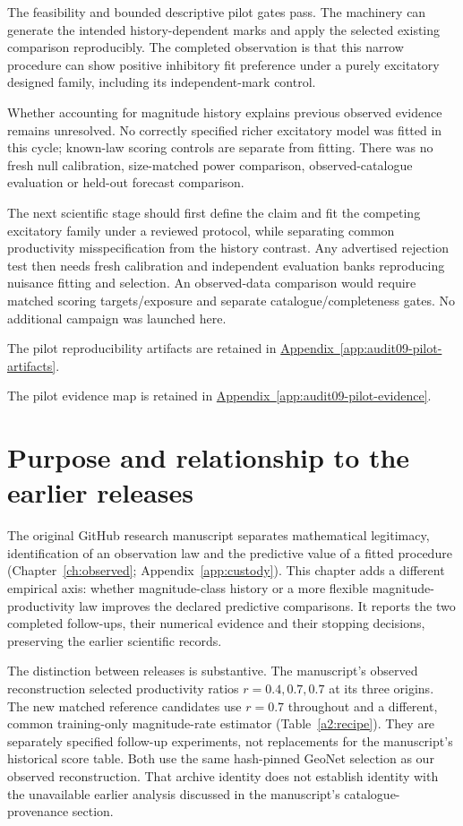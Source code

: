 The feasibility and bounded descriptive pilot gates pass. The machinery can generate the intended history-dependent marks and apply the selected existing comparison reproducibly. The completed observation is that this narrow procedure can show positive inhibitory fit preference under a purely excitatory designed family, including its independent-mark control.

Whether accounting for magnitude history explains previous observed evidence remains unresolved. No correctly specified richer excitatory model was fitted in this cycle; known-law scoring controls are separate from fitting. There was no fresh null calibration, size-matched power comparison, observed-catalogue evaluation or held-out forecast comparison.

The next scientific stage should first define the claim and fit the competing excitatory family under a reviewed protocol, while separating common productivity misspecification from the history contrast. Any advertised rejection test then needs fresh calibration and independent evaluation banks reproducing nuisance fitting and selection. An observed-data comparison would require matched scoring targets/exposure and separate catalogue/completeness gates. No additional campaign was launched here.

\noindent The pilot reproducibility artifacts are retained in \hyperref[app:audit09-pilot-artifacts]{Appendix~\ref{app:audit09-pilot-artifacts}}.

\noindent The pilot evidence map is retained in \hyperref[app:audit09-pilot-evidence]{Appendix~\ref{app:audit09-pilot-evidence}}.

\section{Purpose and relationship to the earlier releases}
\label{a2:purpose}

The original GitHub research manuscript separates mathematical legitimacy,
identification of an observation law and the predictive value of a fitted
procedure (Chapter~\ref{ch:observed}; Appendix~\ref{app:custody}). This chapter adds a different empirical
axis: whether magnitude-class history or a more flexible magnitude-productivity
law improves the declared predictive comparisons. It reports the two completed
follow-ups, their numerical evidence and their stopping decisions, preserving
the earlier scientific records.

The distinction between releases is substantive. The manuscript's observed
reconstruction selected productivity ratios \(r=0.4,0.7,0.7\) at its three
origins. The new matched reference candidates use \(r=0.7\) throughout and a
different, common training-only magnitude-rate estimator
(Table~\ref{a2:recipe}). They are separately specified follow-up experiments,
not replacements for the manuscript's historical score table. Both use the
same hash-pinned GeoNet selection as our observed reconstruction. That archive
identity does not establish identity with the unavailable earlier analysis
discussed in the manuscript's catalogue-provenance section.


